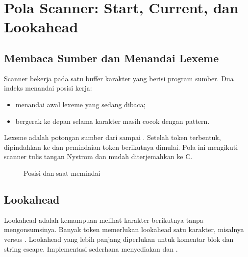 \section{Pola Scanner: Start, Current, dan Lookahead}
\label{sec:ch07-buffer}

\subsection{Membaca Sumber dan Menandai Lexeme}

Scanner bekerja pada satu buffer karakter yang berisi program sumber.
Dua indeks menandai posisi kerja:
\begin{itemize}[leftmargin=*]
  \item {} menandai awal lexeme yang sedang dibaca;
  \item {} bergerak ke depan selama karakter masih cocok
        dengan pattern.
\end{itemize}
Lexeme adalah potongan sumber dari  sampai
. Setelah token terbentuk,  dipindahkan ke
 dan pemindaian token berikutnya dimulai. Pola ini
mengikuti scanner tulis tangan Nystrom dan mudah diterjemahkan ke C.

\begin{figure}[H]
\centering
{}
\caption{Posisi  dan  saat memindai }
\label{fig:ch07-buffer}
\end{figure}

\subsection{Lookahead}

Lookahead adalah kemampuan melihat karakter berikutnya tanpa
mengonsumsinya. Banyak token memerlukan lookahead satu karakter,
misalnya \code{<} versus \code{<=}. Lookahead yang lebih panjang
diperlukan untuk komentar blok dan string escape. Implementasi
sederhana menyediakan  dan .

